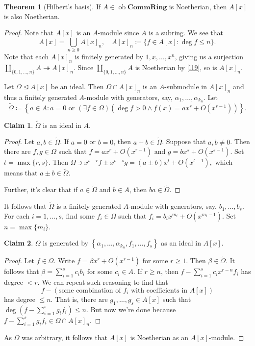 \documentclass[10pt,letterpaper,cm]{nupset}
\theoremstyle{definition}
\theoremstyle{theorem}
\newtheorem{theorem}[definition]{Theorem}
\newtheorem*{claim}{Claim}
\theoremstyle{remark}
\newcommand{\1}{\mathbf{1}}
\newcommand{\0}{\vec 0}
\DeclareMathOperator{\ob}{ob}
\begin{document}
\begin{theorem}[Hilbert's basis] 
If $A\in \ob{\mathbf{CommRing}}$ is Noetherian, then $A[x]$ is also Noetherian. 
\end{theorem}
\begin{proof}
Note that $A[x]$ is an $A$-module since $A$ is a subring. We see that $$A[x] = \bigcup_{n\geq 0} A[x]_n, \quad A[x]_n \coloneqq \{f \in A[x] : \deg f \leq n\}.$$
Note that each $A[x]_n$ is finitely generated by $1, x, \ldots, x^n$, giving us a surjection $\coprod_{\{0, 1, \ldots, n\}}A \twoheadrightarrow A[x]_n$. Since $\coprod_{\{0, 1, \ldots, n\}}A$ is Noetherian by \cref{l19}, so is $A[x]_n$.

\medskip

 Let $\Omega \unlhd A[x]$ be an ideal. Then $\Omega \cap A[x]_n$ is an $A$-submodule in $A[x]_n$ and thus a finitely generated $A$-module with generators, say, $\alpha_1, \ldots, \alpha_{k_n}$. Let $$\widetilde{\Omega} \coloneqq  \left\{a\in A : a = 0 \text{ or } \left(\exists f\in \Omega\right)\left(\deg f >0 \land f(x) = ax^r+ O(x^{r-1})\right)\right\}.$$
\begin{claim}
$\widetilde{\Omega}$ is an ideal in $A$.
\end{claim}
\begin{proof}
Let $a,b \in \widetilde{\Omega}$. If $a=0$ or $b=0$, then $a+b\in \widetilde{\Omega}$. Suppose that $a,b\ne 0$. Then there are $f, g \in 
\Omega$ such that $f= ax^r + O(x^{r-1})$ and $g= bx^s + O(x^{s-1})$. Set $t=\max\{r, s\}$. Then ${\Omega} \ni x^{t-r}f \pm x^{t-s}g = (a\pm b)x^t +O(x^{t-1}),$ which means that $a\pm b \in \widetilde{\Omega}$.

\medskip


Further, it's clear that if $a\in \widetilde{\Omega}$ and $b\in A$, then $ba\in \widetilde{\Omega}$. 
\end{proof}
It follows that $\widetilde{\Omega}$ is a finitely generated $A$-module with generators, say, $b_1, \ldots, b_s$. For each $i=1, \ldots, s$, find some $f_i \in \Omega$ such that $f_i = b_ix^{m_i} + O(x^{m_i-1})$. Set $n= \max\{m_i\}$.
\begin{claim}
$\Omega$ is generated by $\left\{\alpha_1, \ldots, \alpha_{k_n}, f_1, \ldots, f_s\right\}$ as an ideal in $A[x]$.
\end{claim}
\begin{proof}
Let $f\in \Omega$. Write $f = \beta x^r + O(x^{r-1})$ for some $r \geq 1$. Then $\beta \in \widetilde{\Omega}$. It follows that $\beta = \sum_{i=1}^s c_ib_i$ for some $c_i \in A$. If $r \geq n$, then $f -\sum_{i=1}^s c_ix^{r-n}f_i$ has degree $< r$. We can repeat such reasoning to find that $$f - \left(\text{some combination of } f_i \text{ with coefficients in } A[x]\right)$$ has degree $\leq n$. That is, there are $g_1, \ldots, g_s \in A[x]$ such that $\deg\left(f - \sum_{i=1}^sg_if_i\right) \leq n$. But now we're done because $f - \sum_{i=1}^sg_if_i \in \Omega \cap A[x]_n$.
\end{proof}$ $As $\Omega$ was arbitrary, it follows that $A[x]$ is Noetherian as an $A[x]$-module. 
\end{proof}
\end{document}
